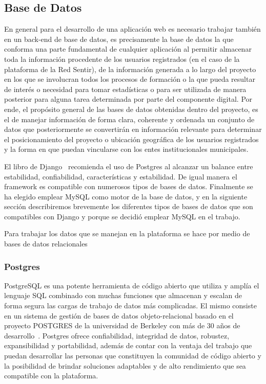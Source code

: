\documentclass[journal,transmag]{IEEEtran}
\begin{document}
\subsection{Base de Datos}
En general para el desarrollo de una aplicación web es necesario trabajar también en un back-end de base de datos, es precisamente la base de datos la que conforma una parte fundamental de cualquier aplicación al permitir almacenar toda la información procedente de los usuarios registrados (en el caso de la plataforma de la Red Sentir), de la información generada a lo largo del proyecto en los que se involucran todos los procesos de formación o la que pueda resultar de interés o necesidad para tomar estadísticas o para ser utilizada de manera posterior para alguna tarea determinada por parte del componente digital. Por ende, el propósito general de las bases de datos obtenidas dentro del proyecto, es el de manejar información de forma clara, coherente y ordenada un conjunto de datos que posteriormente se convertirán en información relevante para determinar el posicionamiento del proyecto o ubicación geográfica de los usuarios registrados y la forma en que puedan vincularse con los entes institucionales municipales. 

El libro de Django~\cite{DjangoM} recomienda el uso de Postgres al alcanzar un balance entre estabilidad, confiabilidad, características y estabilidad. De igual manera el framework es compatible con numerosos tipos de bases de datos. Finalmente se ha elegido emplear MySQL como motor de la base de datos, y en la siguiente sección describiremos brevemente los diferentes tipos de bases de datos que son compatibles con Django y porque se decidió emplear MySQL en el trabajo.

Para trabajar los datos que se manejan en la plataforma se hace por medio de bases de datos relacionales
\subsubsection{Postgres}
PostgreSQL es una potente herramienta de código abierto que utiliza y amplía el lenguaje SQL combinado con muchas funciones que almacenan y escalan de forma segura las cargas de trabajo de datos más complicadas. El mismo consiste en un sistema de gestión de bases de datos objeto-relacional basado en el proyecto POSTGRES de la universidad de Berkeley con más de 30 años de desarrollo~\cite{Postgres}. Postgres ofrece confiabilidad, integridad de datos, robustez, expansibilidad y portabilidad, además de contar con la ventaja del trabajo que puedan desarrollar las personas que constituyen la comunidad de código abierto y la posibilidad de brindar soluciones adaptables y de alto rendimiento que sea compatible con la plataforma. 
\end{document}
